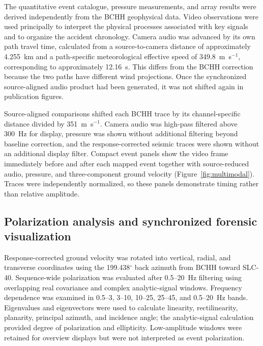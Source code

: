 \documentclass[]{seismica}
\begin{document}
The quantitative event catalogue, pressure measurements, and array results were
derived independently from the BCHH geophysical data. Video observations were
used principally to interpret the physical processes associated with key
signals and to organize the accident chronology. Camera audio was advanced by
its own path travel time, calculated from a source-to-camera distance of
approximately 4.255~km and a path-specific meteorological effective speed of
349.8~m~s$^{-1}$, corresponding to approximately 12.16~s. This differs from
the BCHH correction because the two paths have different wind projections.
Once the synchronized source-aligned audio product had been generated, it was
not shifted again in publication figures.

Source-aligned comparisons shifted each BCHH trace by its channel-specific
distance divided by 351~m~s$^{-1}$. Camera audio was high-pass filtered above
300~Hz for display, pressure was shown without additional filtering beyond
baseline correction, and the response-corrected seismic traces were shown
without an additional display filter.
Compact event panels show the video frame immediately before and after each
mapped event together with source-reduced audio, pressure, and three-component
ground velocity (Figure~\ref{fig:multimodal}). Traces were independently
normalized, so these panels demonstrate timing rather than relative amplitude.

\subsection{Polarization analysis and synchronized forensic visualization}
\label{sec:methods_polarization}

Response-corrected ground velocity was rotated into vertical, radial, and
transverse coordinates using the 199.438$^\circ$ back azimuth from BCHH toward
SLC-40. Sequence-wide polarization was evaluated after 0.5--20~Hz filtering
using overlapping real covariance and complex analytic-signal windows.
Frequency dependence was examined in 0.5--3, 3--10, 10--25, 25--45, and
0.5--20~Hz bands. Eigenvalues and eigenvectors were used to calculate
linearity, rectilinearity, planarity, principal azimuth, and incidence angle;
the analytic-signal calculation provided degree of polarization and
ellipticity. Low-amplitude windows were retained for overview displays but were
not interpreted as event polarization.
\end{document}
